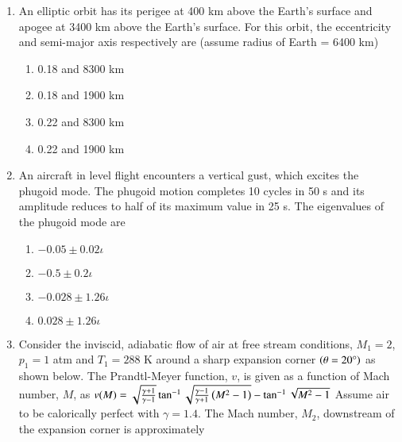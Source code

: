 \documentclass[journal]{IEEEtran}
\begin{document}
\begin{enumerate}
\item An elliptic orbit has its perigee at 400 km above the Earth's surface and apogee at 3400 km above the Earth's surface. For this orbit, the eccentricity and semi-major axis respectively are (assume radius of Earth = 6400 km)
\begin{multicols}{2}
    \begin{enumerate}
        \item 0.18 and 8300 km
        \item 0.18 and 1900 km
        \item 0.22 and 8300 km
        \item 0.22 and 1900 km
    \end{enumerate}
\end{multicols}

\item An aircraft in level flight encounters a vertical gust, which excites the phugoid mode. The phugoid motion completes 10 cycles in 50 s and its amplitude reduces to half of its maximum value in 25 s. The eigenvalues of the phugoid mode are
\begin{multicols}{2}
    \begin{enumerate}
        \item $-0.05 \pm 0.02 \iota$
        \item $-0.5 \pm 0.2 \iota$
        \item $-0.028 \pm 1.26 \iota$
        \item $0.028 \pm 1.26 \iota$
    \end{enumerate}
\end{multicols}

\item Consider the inviscid, adiabatic flow of air at free stream conditions, $M_1 = 2$, $p_1 = 1$ atm and $T_1 = 288$ K around a sharp expansion corner $\left(\theta = 20 \degree\right)$ as shown below. The Prandtl-Meyer function, $v$, is given as a function of Mach number, $M$, as $v(M) = \sqrt{\frac{\gamma + 1}{\gamma - 1}} \tan^{-1} \sqrt{\frac{\gamma - 1}{\gamma + 1}\left(M^2 - 1\right)} - \tan^{-1} \sqrt{M^2 - 1}$
Assume air to be calorically perfect with $\gamma = 1.4$. The Mach number, $M_2$, downstream of the expansion corner is approximately
\end{enumerate}
\end{document}
